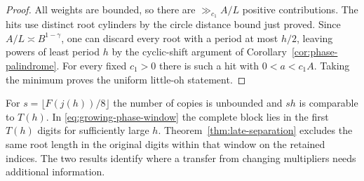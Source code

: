 \begin{proof}
All weights are bounded, so there are \(\gg_{c_1} A/L\)
positive contributions. The hits use distinct root cylinders by
the circle distance bound just proved. Since \(A/L\asymp
B^{1-\gamma}\), one can discard every root with a period
at most \(h/2\), leaving powers of least period \(h\)
by the cyclic-shift argument of Corollary~\ref{cor:phase-palindrome}.
For every fixed \(c_1>0\) there is such a hit with \(0<a<c_1A\).
Taking the minimum proves the uniform little-oh statement.
\end{proof}

For \(s=\lfloor F(j(h))/8\rfloor\) the number of copies is unbounded
and \(sh\) is comparable to \(T(h)\). In \eqref{eq:growing-phase-window}
the complete block lies in the first \(T(h)\) digits for sufficiently
large \(h\). Theorem~\ref{thm:late-separation} excludes the same
root length in the original digits within that window on the retained
indices. The two results identify where a transfer from changing
multipliers needs additional information.

